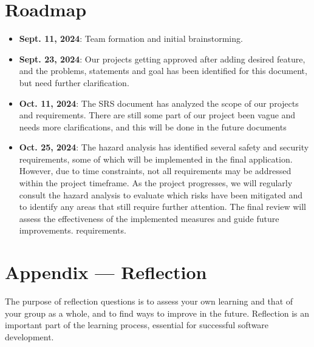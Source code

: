 \documentclass{article}
\begin{document}
\section{Roadmap}
\begin{itemize}
    \item \textbf{Sept. 11, 2024}: Team formation and initial brainstorming.
    \item \textbf{Sept. 23, 2024}: Our projects getting approved after adding desired feature, and the problems, statements and goal has been identified for this document, but need further clarification.
    \item \textbf{Oct. 11, 2024}: The SRS document has analyzed the scope of our projects and requirements. There are still some part of our project been vague and needs more clarifications, and this will be done in the future documents

    \item \textbf{Oct. 25, 2024}: The hazard analysis has identified several safety and security requirements, some of which will be implemented in the final application. However, due to time constraints, not all requirements may be addressed within the project timeframe. As the project progresses, we will regularly consult the hazard analysis to evaluate which risks have been mitigated and to identify any areas that still require further attention. The final review will assess the effectiveness of the implemented measures and guide future improvements.
 requirements.
\end{itemize}

\newpage

\section*{Appendix — Reflection}
The purpose of reflection questions is to assess your own learning and that of your group as a whole, and to find ways to improve in the future. Reflection is an important part of the learning process, essential for successful software development.
\end{document}
